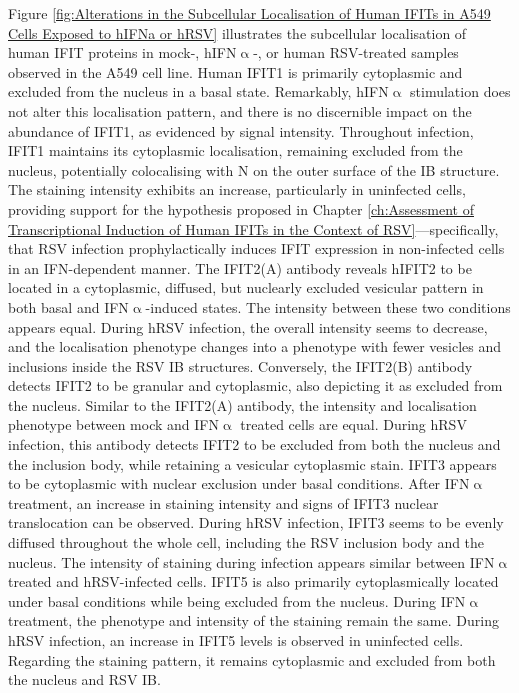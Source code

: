 Figure \ref{fig:Alterations in the Subcellular Localisation of Human IFITs in A549 Cells Exposed to hIFNa or hRSV} illustrates the subcellular localisation of human IFIT proteins in mock-, hIFN$\upalpha$-, or human RSV-treated samples observed in the A549 cell line. Human IFIT1 is primarily cytoplasmic and excluded from the nucleus in a basal state. Remarkably, hIFN$\upalpha$ stimulation does not alter this localisation pattern, and there is no discernible impact on the abundance of IFIT1, as evidenced by signal intensity. Throughout infection, IFIT1 maintains its cytoplasmic localisation, remaining excluded from the nucleus, potentially colocalising with N on the outer surface of the IB structure. The staining intensity exhibits an increase, particularly in uninfected cells, providing support for the hypothesis proposed in Chapter \ref{ch:Assessment of Transcriptional Induction of Human IFITs in the Context of RSV}—specifically, that RSV infection prophylactically induces IFIT expression in non-infected cells in an IFN-dependent manner. The IFIT2(A) antibody reveals hIFIT2 to be located in a cytoplasmic, diffused, but nuclearly excluded vesicular pattern in both basal and IFN$\upalpha$-induced states. The intensity between these two conditions appears equal. During hRSV infection, the overall intensity seems to decrease, and the localisation phenotype changes into a phenotype with fewer vesicles and inclusions inside the RSV IB structures. Conversely, the IFIT2(B) antibody detects IFIT2 to be granular and cytoplasmic, also depicting it as excluded from the nucleus. Similar to the IFIT2(A) antibody, the intensity and localisation phenotype between mock and IFN$\upalpha$ treated cells are equal. During hRSV infection, this antibody detects IFIT2 to be excluded from both the nucleus and the inclusion body, while retaining a vesicular cytoplasmic stain. IFIT3 appears to be cytoplasmic with nuclear exclusion under basal conditions. After IFN$\upalpha$ treatment, an increase in staining intensity and signs of IFIT3 nuclear translocation can be observed. During hRSV infection, IFIT3 seems to be evenly diffused throughout the whole cell, including the RSV inclusion body and the nucleus. The intensity of staining during infection appears similar between IFN$\upalpha$ treated and hRSV-infected cells. IFIT5 is also primarily cytoplasmically located under basal conditions while being excluded from the nucleus. During IFN$\upalpha$ treatment, the phenotype and intensity of the staining remain the same. During hRSV infection, an increase in IFIT5 levels is observed in uninfected cells. Regarding the staining pattern, it remains cytoplasmic and excluded from both the nucleus and RSV IB.

